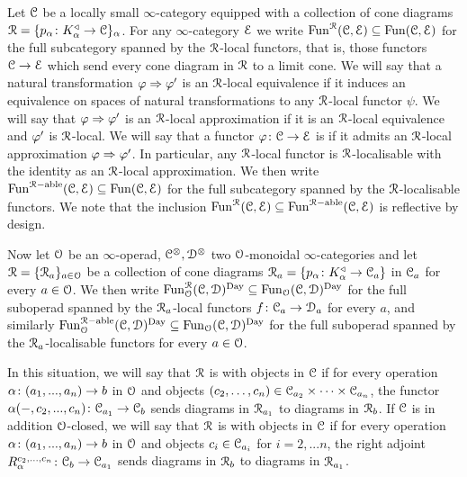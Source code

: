 \begin{notation}
\label{notation:cone-diagrams}%
Let $\mathcal C$ be a locally small $\infty$-category equipped with a collection of cone diagrams $\mathcal{R} = \{p_{\alpha}\colon K_{\alpha}^{\triangleleft} \to \mathcal C\}_{\alpha}$. For any $\infty$-category %
$\mathcal{E}$ we write
$\operatorname{Fun}^{\mathcal{R}}(\mathcal C,\mathcal{E}) \subseteq \operatorname{Fun}(\mathcal C,\mathcal{E})$ for the full subcategory spanned by the $\mathcal{R}$-local functors, that is, those functors $\mathcal C \to \mathcal{E}$ which send every cone diagram in $\mathcal{R}$ to a limit cone. We will say that a natural transformation $\varphi \Rightarrow \varphi'$ is an $\mathcal{R}$-local equivalence if it induces an equivalence on spaces of natural transformations to any $\mathcal{R}$-local functor $\psi$. We will say that $\varphi \Rightarrow \varphi'$ is an $\mathcal{R}$-local approximation if it is an $\mathcal{R}$-local equivalence and $\varphi'$ is $\mathcal{R}$-local.
We will say that a functor $\varphi\colon \mathcal C \to \mathcal{E}$ is   if it admits an $\mathcal{R}$-local approximation $\varphi \Rightarrow \varphi'$. 
In particular, any $\mathcal{R}$-local functor is $\mathcal{R}$-localisable with the identity as an $\mathcal{R}$-local approximation. We then write $\operatorname{Fun}^{\mathcal{R}-\mathrm{able}}(\mathcal C,\mathcal{E}) \subseteq \operatorname{Fun}(\mathcal C,\mathcal{E})$ for the full subcategory spanned by the $\mathcal{R}$-localisable functors. We note that the inclusion $\operatorname{Fun}^{\mathcal{R}}(\mathcal C,\mathcal{E}) \subseteq \operatorname{Fun}^{\mathcal{R}-\mathrm{able}}(\mathcal C,\mathcal{E})$ is reflective by design.

Now let $\mathcal{O}$ be an $\infty$-operad, $\mathcal C^{\otimes},\mathcal{D}^{\otimes}$ two $\mathcal{O}$-monoidal $\infty$-categories and let $\mathcal{R} = \{\mathcal{R}_a\}_{a \in \mathcal{O}}$ be a collection of cone diagrams $\mathcal{R}_a = \{p_{\alpha}\colon K_{\alpha}^{\triangleleft} \to \mathcal C_a\}$ in $\mathcal C_a$ for every $a \in \mathcal{O}$. We then write $\operatorname{Fun}^{\mathcal{R}}_{\mathcal{O}}(\mathcal C,\mathcal{D})^{\mathrm{Day}} \subseteq \operatorname{Fun}_{\mathcal{O}}(\mathcal C,\mathcal{D})^{\mathrm{Day}}$ for the full suboperad spanned by the $\mathcal{R}_a$-local functors $f\colon \mathcal C_a \to \mathcal{D}_a$ for every $a$, and similarly $\operatorname{Fun}_{\mathcal{O}}^{\mathcal{R}-\mathrm{able}}(\mathcal C,\mathcal{D})^{\mathrm{Day}} \subseteq \operatorname{Fun}_{\mathcal{O}}(\mathcal C,\mathcal{D})^{\mathrm{Day}}$ for the full suboperad spanned by the $\mathcal{R}_a$-localisable functors for every $a \in \mathcal{O}$. 

In this situation, we will say that $\mathcal{R}$ is  with objects in $\mathcal C$ if for every operation $\alpha\colon (a_1,...,a_n) \to b$ in $\mathcal{O}$ and objects $(c_2,\dots,c_n) \in \mathcal C_{a_2}\times \dots \times \mathcal C_{a_n}$, the functor $\alpha(-,c_2,...,c_n)\colon \mathcal C_{a_1} \to \mathcal C_b$ sends diagrams in $\mathcal{R}_{a_1}$ to diagrams in $\mathcal{R}_b$. If $\mathcal C$ is in addition $\mathcal{O}$-closed, we will say that $\mathcal{R}$ is  with objects in $\mathcal C$ if for every operation $\alpha\colon (a_1,...,a_n) \to b$ in $\mathcal{O}$ and objects $c_i \in \mathcal C_{a_i}$ for $i=2,...n$, the right adjoint $R^{c_2,...,c_n}_{\alpha}\colon \mathcal C_{b} \to \mathcal C_{a_1}$ sends diagrams in $\mathcal{R}_{b}$ to diagrams in $\mathcal{R}_{a_1}$.

\end{notation}

